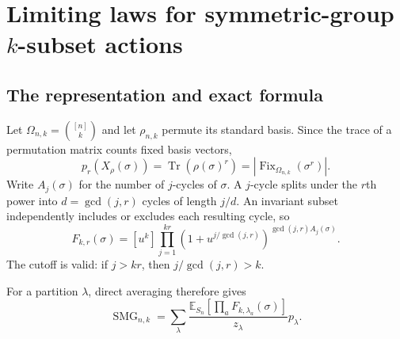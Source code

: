 \documentclass[10pt]{article}
\newcommand{\Fix}{\operatorname{Fix}}
\newcommand{\SMG}{\operatorname{SMG}}
\begin{document}
\clearpage
\section[Limiting laws for symmetric-group k-subset actions]{Limiting laws for symmetric-group $k$-subset actions}\label{proof:limit-subsets}
\begingroup
{}
\providecommand{\Fix}{\operatorname{Fix}}
\renewcommand{\Fix}{\operatorname{Fix}}
\providecommand{\SMG}{\operatorname{SMG}}
\renewcommand{\SMG}{\operatorname{SMG}}
\setcounter{theorem}{0}
\setcounter{proposition}{0}
\setcounter{lemma}{0}
\setcounter{corollary}{0}
\setcounter{remark}{0}
\begin{abstract}
For fixed $k$, we prove the joint limit of all power traces of the permutation
representation of $S_n$ on $k$-subsets.  The limit is an explicit functional
of independent $Z_j\sim\mathrm{Poisson}(1/j)$ variables and is non-Poisson for
$k\ge2$.  An independent program constructs 1,584 representation matrices in
dimensions $6,10,15,20$ and performs 6,336 exact power-trace comparisons.
\end{abstract}

\subsection{The representation and exact formula}
Let $\Omega_{n,k}=\binom{[n]}k$ and let $\rho_{n,k}$ permute its standard
basis.  Since the trace of a permutation matrix counts fixed basis vectors,
\[
 p_r(X_{\rho}(\sigma))=\operatorname{Tr}(\rho(\sigma)^r)
 =|\Fix_{\Omega_{n,k}}(\sigma^r)|.
\]
Write $A_j(\sigma)$ for the number of $j$-cycles of $\sigma$.  A $j$-cycle
splits under the $r$th power into $d=\gcd(j,r)$ cycles of length $j/d$.
An invariant subset independently includes or excludes each resulting cycle,
so
\begin{equation}\label{symmetric-k-subsets-proof-and-verification:eq:fixed}
\boxed{F_{k,r}(\sigma)=[u^k]\prod_{j=1}^{kr}
\left(1+u^{j/\gcd(j,r)}\right)^{\gcd(j,r)A_j(\sigma)}.}
\end{equation}
The cutoff is valid: if $j>kr$, then $j/\gcd(j,r)>k$.

For a partition $\lambda$, direct averaging therefore gives
\begin{equation}\label{symmetric-k-subsets-proof-and-verification:eq:smg}
\SMG_{n,k}=\sum_\lambda\frac{\mathbb E_{S_n}
[\prod_aF_{k,\lambda_a}(\sigma)]}{z_\lambda}p_\lambda.
\end{equation}
\end{document}
